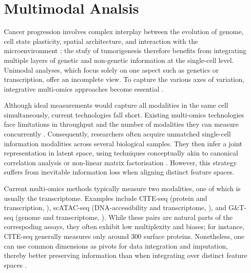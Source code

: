 \section{Multimodal Analsis}

\label{sec:modalities-multimodal-intro}

Cancer progression involves complex interplay between the evolution of genome, cell state plasticity, spatial architecture, and interaction with the microenvironment ; the stufy of tumorigenesis therefore benefits from integrating multiple layers of genetic and non-genetic information at the single-cell level. Unimodal analyses, which focus solely on one aspect such as genetics or transcription, offer an incomplete view. To capture the various axes of variation, integrative multi-omics approaches become essential \parencite{Nam2021-xt,Baysoy2023-qr}.

Although ideal measurements would capture all modalities in the same cell simultaneously, current technologies fall short. Existing multi-omics technologies face limitations in throughput and the number of modalities they can measure concurrently \parencite{Baysoy2023-qr}. Consequently, researchers often acquire unmatched single-cell information modalities across several biological samples. They then infer a joint representation in latent space, using techniques conceptually akin to canonical correlation analysis \parencite{Stuart2019-mi} or non-linear matrix factorisation \parencite{Argelaguet2018-oz,Velten2022-gc}. However, this strategy suffers from inevitable information loss when aligning distinct feature spaces.

Current multi-omics methods typically measure two modalities, one of which is usually the transcriptome. Examples include CITE-seq (protein and transcription, \textcite{Stoeckius2017-rz}), scATAC-seq (DNA-accessibility and transcriptome, \textcite{Lareau2019-xr}), and G\&T-seq (genome and transcriptome, \textcite{Macaulay2015-gh}). While these pairs are natural parts of the correspoding assays, they often exhibit low multiplexity and biases; for instance, CITE-seq generally measures only around 300 surface proteins. Nonetheless, one can use common dimensions as pivots for data integration and imputation, thereby better preserving information than when integrating over distinct feature spaces \parencite{Hao2021-qn}.

